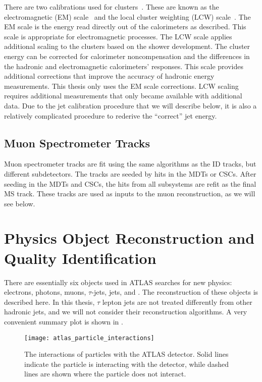 There are two calibrations used for clusters~\cite{PERF-2011-04}.
These are known as the electromagnetic (EM) scale~\cite{PERF-2010-04} and the local cluster weighting (LCW) scale~\cite{PERF-2014-07}.
The EM scale is the energy read directly out of the calorimeters as described.
This scale is appropriate for electromagnetic processes.
The LCW scale applies additional scaling to the clusters based on the shower development.
The cluster energy can be corrected for calorimeter noncompensation and the differences in the hadronic and electromagnetic calorimeters' responses.
This scale provides additional corrections that improve the accuracy of hadronic energy measurements.
This thesis only uses the EM scale corrections.
LCW scaling requires additional measurements that only became available with additional data.
Due to the jet calibration procedure that we will describe below, it is also a relatively complicated procedure to rederive the ``correct'' jet energy.

\subsection{Muon Spectrometer Tracks}\label{sec:ms_tracks}

Muon spectrometer tracks are fit using the same algorithms as the ID tracks, but different subdetectors.
The tracks are seeded by hits in the MDTs or CSCs.
After seeding in the MDTs and CSCs, the hits from all subsystems are refit as the final MS track.
These tracks are used as inputs to the muon reconstruction, as we will see below.

\section{Physics Object Reconstruction and Quality Identification}

There are essentially six objects used in ATLAS searches for new physics: electrons, photons, muons, $\tau$-jets, jets, and \met.
The reconstruction of these objects is described here.
In this thesis, $\tau$ lepton jets are not treated differently from other hadronic jets, and we will not consider their reconstruction algorithms.
A very convenient summary plot is shown in .
\begin{figure}
\caption{The interactions of particles with the ATLAS detector.
Solid lines indicate the particle is interacting with the detector, while dashed lines are shown where the particle does not interact.} \label{fig:atlas_interactions}
\texttt{[image: atlas\_particle\_interactions]}
\end{figure}

